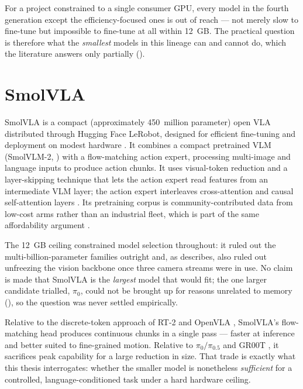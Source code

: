 For a project constrained to a single consumer GPU, every model in the fourth
generation except the efficiency-focused ones is out of reach --- not merely slow to
fine-tune but impossible to fine-tune at all within \SI{12}{GB}. The practical question
is therefore what the \emph{smallest} models in this lineage can and cannot do, which
the literature answers only partially ().

\section{SmolVLA}
\label{sec:bg-smolvla}
SmolVLA is a compact (approximately 450~million parameter) open VLA distributed
through Hugging Face LeRobot, designed for efficient fine-tuning and deployment on
modest hardware \parencite{shukor2025smolvla, cadene2024lerobot}. It combines a
compact pretrained VLM (SmolVLM-2, \parencite{marafioti2025smolvlm}) with a
flow-matching action expert, processing multi-image and language inputs to produce
action chunks. It uses visual-token reduction and a layer-skipping technique that lets
the action expert read features from an intermediate VLM layer; the action expert
interleaves cross-attention and causal self-attention layers
\parencite{kiviranta2025smolvla, shukor2025smolvla}. Its pretraining corpus is
community-contributed data from low-cost arms rather than an industrial fleet, which is
part of the same affordability argument \parencite{shukor2025smolvla}.

The \SI{12}{GB} ceiling constrained model selection throughout: it ruled out the
multi-billion-parameter families outright and, as  describes,
also ruled out unfreezing the vision backbone once three camera streams were in use. No
claim is made that SmolVLA is the \emph{largest} model that would fit; the one larger
candidate trialled, $\pi_0$, could not be brought up for reasons unrelated to memory
(), so the question was never settled empirically.

Relative to the discrete-token approach of RT-2 \parencite{zitkovich2023rt2} and
OpenVLA \parencite{kim2024openvla}, SmolVLA's flow-matching head produces continuous
chunks in a single pass --- faster at inference and better suited to fine-grained
motion. Relative to $\pi_{0}/\pi_{0.5}$ and GR00T
\parencite{black2024pi0, black2025pi05, nvidia2025gr00t}, it sacrifices peak capability
for a large reduction in size. That trade is exactly what this thesis interrogates:
whether the smaller model is nonetheless \emph{sufficient} for a controlled,
language-conditioned task under a hard hardware ceiling.

